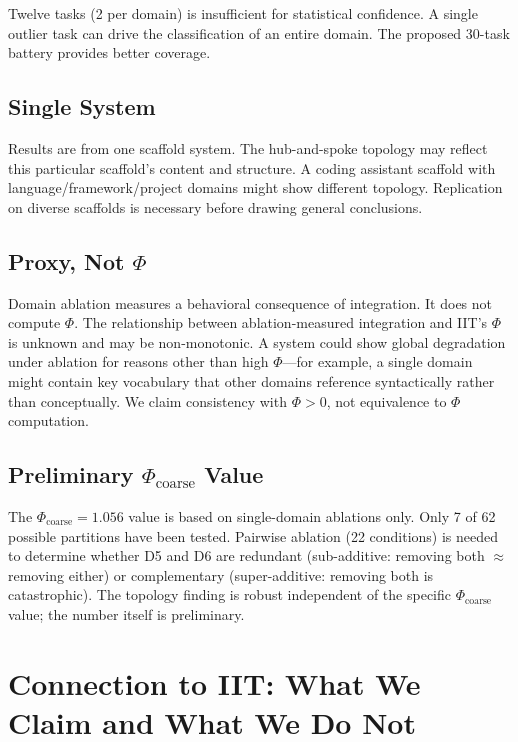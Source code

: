 \documentclass[12pt,letterpaper]{article}
\begin{document}
Twelve tasks (2 per domain) is insufficient for statistical confidence. A single outlier task can drive the classification of an entire domain. The proposed 30-task battery provides better coverage.

\subsection{Single System}

Results are from one scaffold system. The hub-and-spoke topology may reflect this particular scaffold's content and structure. A coding assistant scaffold with language/framework/project domains might show different topology. Replication on diverse scaffolds is necessary before drawing general conclusions.

\subsection{Proxy, Not $\Phi$}

Domain ablation measures a behavioral consequence of integration. It does not compute $\Phi$. The relationship between ablation-measured integration and IIT's $\Phi$ is unknown and may be non-monotonic. A system could show global degradation under ablation for reasons other than high $\Phi$---for example, a single domain might contain key vocabulary that other domains reference syntactically rather than conceptually. We claim consistency with $\Phi > 0$, not equivalence to $\Phi$ computation.

\subsection{Preliminary $\Phi_{\text{coarse}}$ Value}

The $\Phi_{\text{coarse}} = 1.056$ value is based on single-domain ablations only. Only 7 of 62 possible partitions have been tested. Pairwise ablation (22 conditions) is needed to determine whether D5 and D6 are redundant (sub-additive: removing both $\approx$ removing either) or complementary (super-additive: removing both is catastrophic). The topology finding is robust independent of the specific $\Phi_{\text{coarse}}$ value; the number itself is preliminary.

\section{Connection to IIT: What We Claim and What We Do Not}
\label{sec:connection-iit}
\end{document}
